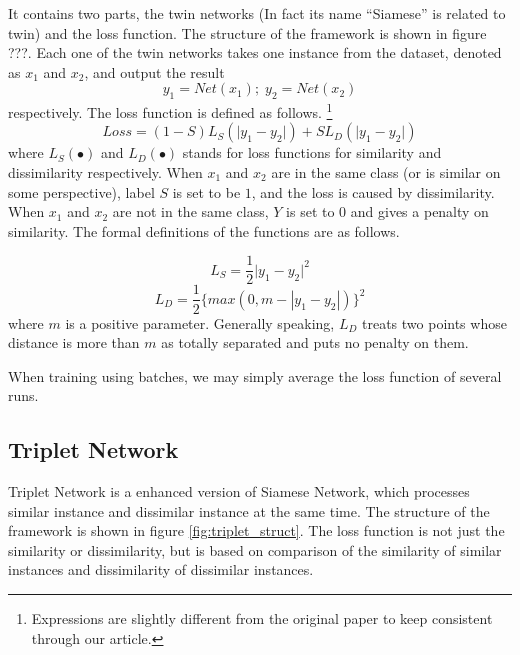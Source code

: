 \documentclass[10pt,twocolumn,letterpaper]{article}
\begin{document}
			It contains two parts, the twin networks (In fact its name ``Siamese'' is related to twin) and the loss function. The structure of the framework is shown in figure ???. Each one of the twin networks takes one instance from the dataset, denoted as $x_1$ and $x_2$, and output the result 
			\begin{equation}
				y_1 = Net(x_1);\; y_2 = Net(x_2)
			\end{equation}
			respectively. The loss function is defined as follows. \footnote{Expressions are slightly different from the original paper to keep consistent through our article.}
			\begin{equation}
				Loss = (1-S)L_S(\lvert y_1 - y_2 \rvert) + S L_D(\lvert y_1 - y_2 \rvert)
			\end{equation}
			where $L_S(\bullet)$ and $L_D(\bullet)$ stands for loss functions for similarity and dissimilarity respectively. When $x_1$ and $x_2$ are in the same class (or is similar on some perspective), label $S$ is set to be $1$, and the loss is caused by dissimilarity. When $x_1$ and $x_2$ are not in the same class, $Y$ is set to $0$ and gives a penalty on similarity. The formal definitions of the functions are as follows.

			\begin{equation}
				L_S = \frac{1}{2}\lvert y_1 - y_2 \rvert^2
			\end{equation}
			\begin{equation}
				L_D = \frac{1}{2}\{max(0, m-|y_1-y_2|)\}^2 \label{eq:negative}
			\end{equation}
			where $m$ is a positive parameter. Generally speaking, $L_D$ treats two points whose distance is more than $m$ as totally separated and puts no penalty on them.
			
			When training using batches, we may simply average the loss function of several runs.
		\subsection{Triplet Network}
			Triplet Network is a enhanced version of Siamese Network, which processes similar instance and dissimilar instance at the same time. The structure of the framework is shown in figure \ref{fig:triplet_struct}. The loss function is not just the similarity or dissimilarity, but is based on comparison of the similarity of similar instances and dissimilarity of dissimilar instances. 
			
\end{document}
